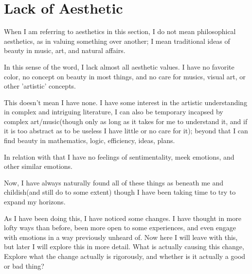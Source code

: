 \section{Lack of Aesthetic}
\par When I am referring to aesthetics in this section, I do not mean philosophical aesthetics, as in valuing something over another; I mean traditional ideas of beauty in music, art, and natural affairs.
\par In this sense of the word, I lack almost all aesthetic values. I have no favorite color, no concept on beauty in most things, and no care for musics, visual art, or other 'artistic' concepts.
\par This doesn't mean I have none. I have some interest in the artistic understanding in complex and intriguing literature, I can  also be temporary incapsed by complex art/music(though only as long as it takes for me to understand it, and if it is too abstract as to be useless I have little or no care for it); beyond that I can find beauty in mathematics, logic, efficiency, ideas, plans.
\par In relation with that I have no feelings of sentimentality, meek emotions, and other similar emotions.
\par Now, I have always naturally found all of these things as beneath me and childish(and still do to some extent) though I have been taking time to try to expand my horizons. 
\par As I have been doing this, I have noticed some changes. I have thought in more lofty ways than before, been more open to some experiences, and even engage with emotions in a way previously unheard of. Now here I will leave with this, but later I will explore this in more detail. What is actually causing this change, Explore what the change actually is rigorously, and whether is it actually a good or bad thing?
